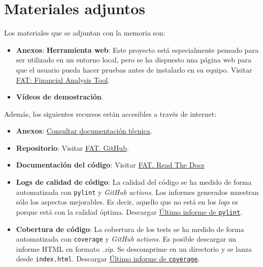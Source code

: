 \section{Materiales adjuntos}\label{materiales-adjuntos}

Los materiales que se adjuntan con la memoria son: 

\begin{itemize}
\item
	\textbf{Anexos}: 
	\textbf{Herramienta web}:
	Este proyecto está especialmente pensado para ser utilizado en un entorno local, pero se ha dispuesto una página web para que el usuario pueda hacer pruebas antes de instalarlo en su equipo. Visitar \href{http://takeiteasy.pythonanywhere.com/}{FAT: Financial Analysis Tool}.
\item	
	\textbf{Vídeos de demostración}.
\end{itemize}

Además, los siguientes recursos están accesibles a través de internet:

\begin{itemize}
\item 
  \textbf{Anexos}: \href{https://github.com/rmt0009alu/FAT/blob/main/docs/latex/anexos.pdf}{Consultar documentación técnica}.
\item
  \textbf{Repositorio}: 
  Visitar \href{https://github.com/rmt0009alu/FAT}{FAT. GitHub}.
\item
  \textbf{Documentación del código}: 
  Visitar \href{https://fat.readthedocs.io/es/latest/intro.html#}{FAT. Read The Docs} 
\item 
  \textbf{Logs de calidad de código}: La calidad del código se ha medido de forma automatizada con \texttt{pylint} y \emph{GitHub actions}. Los informes generados muestran sólo los aspectos mejorables. Es decir, aquello que no está en los \emph{logs} es porque está con la calidad óptima. Descargar \href{https://github.com/rmt0009alu/FAT/actions/runs/9451158145/artifacts/1586050874}{Último informe de \texttt{pylint}}.
\item
  \textbf{Cobertura de código}: La cobertura de los tests se ha medido de forma automatizada con \texttt{coverage} y \emph{GitHub actions}. Es posible descargar un informe HTML en formato \emph{.zip}. Se descomprime en un directorio y se lanza desde \texttt{index.html}. Descargar \href{https://github.com/rmt0009alu/FAT/actions/runs/9451158144/artifacts/1586067173}{Último informe de \texttt{coverage}}.

\end{itemize}


